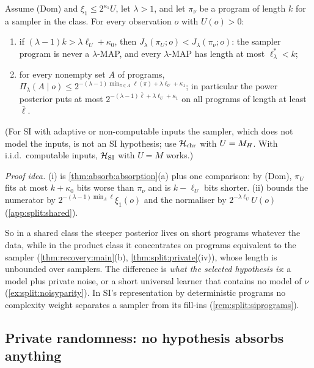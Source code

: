 \begin{theorem}\label{thm:split:shared}
Assume (Dom) and $\xi_1\le2^{\kappa_1}U$, let $\lambda>1$, and let $\pi_\nu$ be a program of length $k$ for a sampler in the class. For every observation $o$ with $U(o)>0$:
\begin{enumerate}[label=(\roman*),itemsep=0pt,topsep=2pt]
\item if $(\lambda-1)k>\lambda\ell_U+\kappa_0$, then $J_\lambda(\pi_U;o)<J_\lambda(\pi_\nu;o)$: the sampler program is never a $\lambda$-MAP, and every $\lambda$-MAP has length at most $\ell^*_\lambda<k$;
\item for every nonempty set $A$ of programs, $\Pi_\lambda(A\mid o)\le2^{-(\lambda-1)\min_{\pi\in A}\ell(\pi)+\lambda\ell_U+\kappa_1}$; in particular the power posterior puts at most $2^{-(\lambda-1)\bar\ell+\lambda\ell_U+\kappa_1}$ on all programs of length at least $\bar\ell$.
\end{enumerate}
(For SI with adaptive or non-computable inputs the sampler, which does not model the inputs, is not an SI hypothesis; use $\mathcal{H}_{\mathrm{chr}}$ with $U=M_{H}$. With i.i.d.\ computable inputs, $\mathcal{H}_{\mathrm{SI}}$ with $U=M$ works.)
\end{theorem}

\emph{Proof idea.} (i) is \cref{thm:absorb:absorption}(a) plus one comparison: by (Dom), $\pi_U$ fits at most $k+\kappa_0$ bits worse than $\pi_\nu$ and is $k-\ell_U$ bits shorter. (ii) bounds the numerator by $2^{-(\lambda-1)\min_A\ell}\xi_1(o)$ and the normaliser by $2^{-\lambda\ell_U}U(o)$ (\cref{app:split:shared}).

So in a shared class the steeper posterior lives on short programs whatever the data, while in the product class it concentrates on programs equivalent to the sampler (\cref{thm:recovery:main}(b), \cref{thm:split:private}(iv)), whose length is unbounded over samplers. The difference is \emph{what the selected hypothesis is}: a model plus private noise, or a short universal learner that contains no model of $\nu$ (\cref{ex:split:noisyparity}). In SI's representation by deterministic programs no complexity weight separates a sampler from its fill-ins (\cref{rem:split:siprograms}).

\subsection{Private randomness: no hypothesis absorbs anything}\label{sec:absorb:private}

